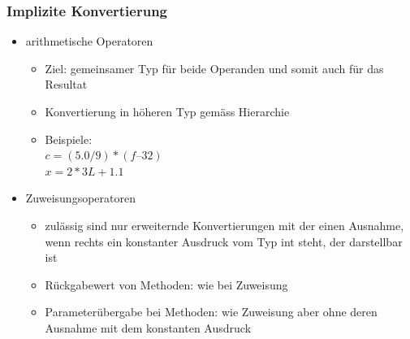 \documentclass[a4paper,10pt]{article}
\begin{document}
\subsubsection{Implizite Konvertierung}
\begin{itemize}
	\item arithmetische Operatoren
		\begin{itemize}
			\item Ziel: gemeinsamer Typ für beide Operanden und somit auch für das Resultat
			\item Konvertierung in höheren Typ gemäss Hierarchie
			\item Beispiele: \\ $c = (5.0/9)*(f – 32)$ \\ $x = 2*3L + 1.1$
		\end{itemize}
	\item Zuweisungsoperatoren
		\begin{itemize}
			\item zulässig sind nur erweiternde Konvertierungen mit der einen Ausnahme, wenn rechts ein konstanter Ausdruck vom Typ int steht, der darstellbar ist
			\item Rückgabewert von Methoden: wie bei Zuweisung
			\item Parameterübergabe bei Methoden: wie Zuweisung aber ohne deren Ausnahme mit dem konstanten Ausdruck
		\end{itemize}
\end{itemize}
\end{document}
